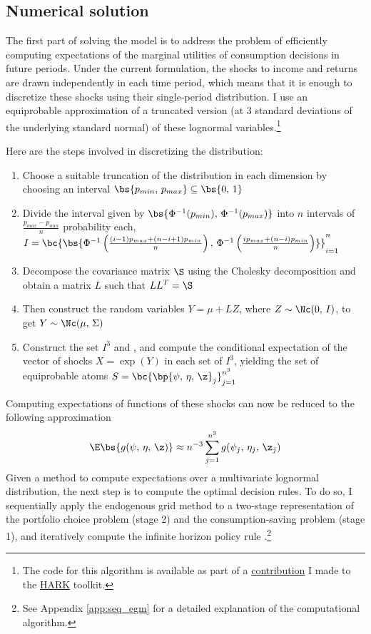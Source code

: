 \subsection{Numerical solution}\label{discretization}

The first part of solving the model is to address the problem of efficiently computing expectations of the marginal utilities of consumption decisions in future periods. Under the current formulation, the shocks to income and returns are drawn independently in each time period, which means that it is enough to discretize these shocks using their single-period distribution. I use an equiprobable approximation of a truncated version (at 3 standard deviations of the underlying standard normal) of these lognormal variables.\footnote{The code for this algorithm is available as part of a \href{https://github.com/econ-ark/HARK/pull/1412}{contribution} I made to the \href{https://github.com/econ-ark/HARK}{HARK} toolkit.}

Here are the steps involved in discretizing the distribution:
\begin{enumerate}
    \item Choose a suitable truncation of the distribution in each dimension by choosing an interval $\bs{p_{min},\,p_{max}} \subseteq \bs{0,\,1}$
    \item Divide the interval given by $\bs{\Phi^{-1}(p_{min}),\,\Phi^{-1}(p_{max})}$ into $n$ intervals of $\frac{p_{max} - p_{min}}{n}$ probability each, $I = \bc{\bs{\Phi^{-1}\left(\frac{(i - 1)p_{max} + (n - i + 1)p_{min}}{n}\right),\,\Phi^{-1}\left(\frac{ip_{max} + (n - i)p_{min}}{n}\right)}}_{i=1}^{n}$
    \item Decompose the covariance matrix $\S$ using the Cholesky decomposition and obtain a matrix $L$ such that $LL^T = \S$
    \item Then construct the random variables $Y = \mu + LZ$, where $Z \sim \Nc(0,\,I)$, to get $Y \sim \Nc(\mu,\,\Sigma)$
    \item Construct the set $I^3$ and , and compute the conditional expectation of the vector of shocks $X = \exp(Y)$ in each set of $I^3$, yielding the set of equiprobable atoms $S = \bc{\bp{\psi,\,\eta,\,\z}_{j}}_{j=1}^{n^3}$
\end{enumerate}

Computing expectations of functions of these shocks can now be reduced to the following approximation
\[
\E\bs{g(\psi,\,\eta,\,\z)} \approx n^{-3}\sum_{j=1}^{n^3}g(\psi_j,\,\eta_j,\,\z_j)
\]
Given a method to compute expectations over a multivariate lognormal distribution, the next step is to compute the optimal decision rules. To do so, I sequentially apply the endogenous grid method to a two-stage representation of the portfolio choice problem (stage 2) and the consumption-saving problem (stage 1), and iteratively compute the infinite horizon policy rule \citep{Carroll2006, Carroll2024}.\footnote{See Appendix \ref{app:seq_egm} for a detailed explanation of the computational algorithm.}